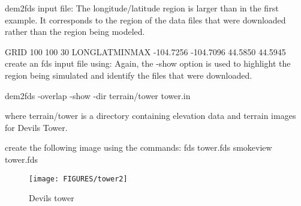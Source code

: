 dem2fds input file:
The longitude/latitude region is larger than in the first example.
It corresponds to the region of the data files that were downloaded rather than the region being modeled.

GRID
 100 100 30
LONGLATMINMAX
 -104.7256 -104.7096 44.5850 44.5945
create an fds input file using:
Again, the -show option is used to highlight the region being simulated and identify the files that were downloaded.

dem2fds -overlap -show -dir terrain/tower tower.in

where terrain/tower is a directory containing elevation data and terrain images for Devils Tower.

create the following image using the commands:
fds tower.fds
smokeview tower.fds

\begin{figure}[bph]
\centerline{
\texttt{[image: FIGURES/tower2]}}
 \caption[FDS file overview]{Devils tower }
\label{devilstowerB}%
\end{figure}

